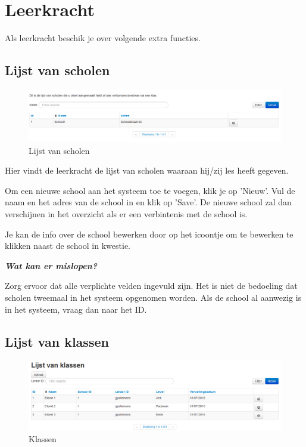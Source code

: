 \documentclass[]{article}
\begin{document}
\section{Leerkracht}

Als leerkracht beschik je over volgende extra functies.

\subsection{Lijst van scholen}

\begin{figure}[!ht]
	\centering
	\includegraphics[width=1\textwidth]{img/schools}
	\caption{Lijst van scholen}
	\label{schools}
\end{figure}

Hier vindt de leerkracht de lijst van scholen waaraan hij/zij les heeft gegeven.

Om een nieuwe school aan het systeem toe te voegen, klik je op 'Nieuw'. Vul de naam en het adres van de school in en klik op 'Save'. De nieuwe school zal dan verschijnen in het overzicht als er een verbintenis met de school is.

Je kan de info over de school bewerken door op het icoontje om te bewerken te klikken naast de school in kwestie.

\textbf{\textit{Wat kan er mislopen?}}

Zorg ervoor dat alle verplichte velden ingevuld zijn. Het is niet de bedoeling dat scholen tweemaal in het systeem opgenomen worden. Als de school al aanwezig is in het systeem, vraag dan naar het ID.

\subsection{Lijst van klassen}

\begin{figure}[!ht]
	\centering
	\includegraphics[width=1\textwidth]{img/classes}
	\caption{Klassen}
	\label{classes}
\end{figure}
\end{document}
